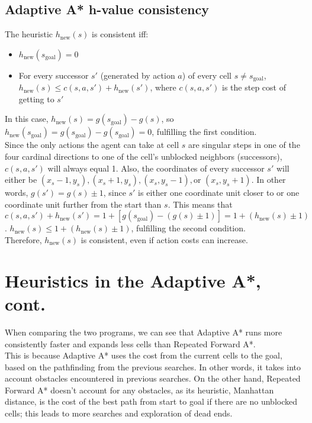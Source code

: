\documentclass{article}
\begin{document}
\subsection{Adaptive A* h-value consistency}
The heuristic $h_{\text{new}}(s)$ is consistent iff:\begin{itemize}
    \item $h_{\text{new}}(s_{\text{goal}})=0$
    \item For every successor $s'$ (generated by action $a$) of every cell $s \ne s_{\text{goal}}$, $h_{\text{new}}(s) \le c(s, a, s') + h_{\text{new}}(s')$, where $c(s, a, s')$ is the step cost of getting to $s'$
\end{itemize}
In this case, $h_{\text{new}}(s) = g(s_{\text{goal}}) - g(s)$, so $h_{\text{new}}(s_{\text{goal}})=g(s_{\text{goal}}) - g(s_{\text{goal}}) = 0$, fulfilling the first condition.\\
Since the only actions the agent can take at cell $s$ are singular steps in one of the four cardinal directions to one of the cell's unblocked neighbors (successors), $c(s,a,s')$ will always equal 1. Also, the coordinates of every successor $s'$ will either be $(x_s-1, y_s), (x_s+1, y_s), (x_s, y_s-1), \text{or } (x_s, y_s+1)$. In other words, $g(s') = g(s) \pm 1$, since $s'$ is either one coordinate unit closer to or one coordinate unit further from the start than $s$. This means that \[c(s, a, s') + h_{\text{new}}(s') = 1 + [g(s_{\text{goal}}) - (g(s) \pm 1)] = 1 + (h_{\text{new}}(s) \pm 1)\]. $h_{\text{new}}(s) \le 1+(h_{\text{new}}(s) \pm 1)$, fulfilling the second condition.\\
Therefore, $h_{\text{new}}(s)$ is consistent, even if action costs can increase.


\section{Heuristics in the Adaptive A*, cont.}
When comparing the two programs, we can see that Adaptive A* runs more consistently faster and expands less cells than Repeated Forward A*.\\ 
This is because Adaptive A* uses the cost from the current cells to the goal, based on the pathfinding from the previous searches. In other words, it takes into account obstacles encountered in previous searches. On the other hand, Repeated Forward A* doesn’t account for any obstacles, as its heuristic, Manhattan distance, is the cost of the best path from start to goal if there are no unblocked cells; this leads to more searches and exploration of dead ends. 
\end{document}
